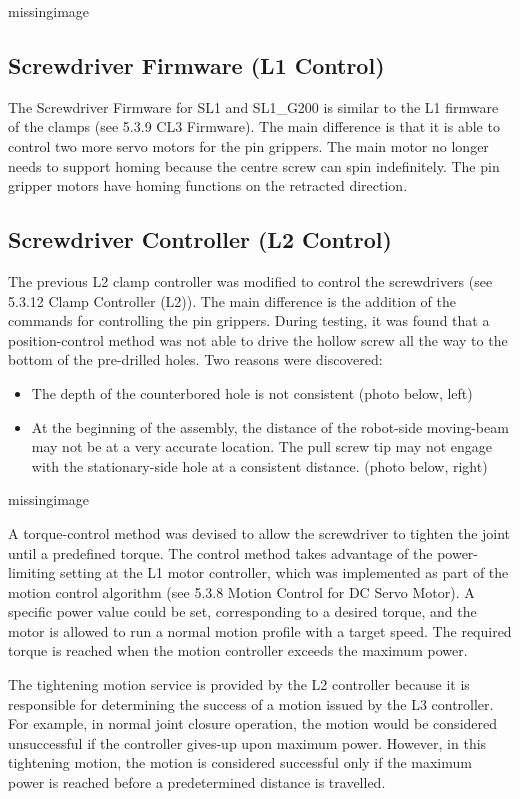 missingimage

\subsection{Screwdriver Firmware (L1 Control)}
The Screwdriver Firmware for SL1 and SL1\_G200 is similar to the L1 firmware of the clamps (see 5.3.9 CL3 Firmware). The main difference is that it is able to control two more servo motors for the pin grippers.
The main motor no longer needs to support homing because the centre screw can spin indefinitely. The pin gripper motors have homing functions on the retracted direction.

\subsection{Screwdriver Controller (L2 Control)}
The previous L2 clamp controller was modified to control the screwdrivers (see 5.3.12 Clamp Controller (L2)). The main difference is the addition of the commands for controlling the pin grippers. 
During testing, it was found that a position-control method was not able to drive the hollow screw all the way to the bottom of the pre-drilled holes. Two reasons were discovered: 
\begin{itemize}
    \item The depth of the counterbored hole is not consistent (photo below, left)
    \item At the beginning of the assembly, the distance of the robot-side moving-beam may not be at a very accurate location. The pull screw tip may not engage with the stationary-side hole at a consistent distance. (photo below, right)
\end{itemize}

missingimage

A torque-control method was devised to allow the screwdriver to tighten the joint until a predefined torque. The control method takes advantage of the power-limiting setting at the L1 motor controller, which was implemented as part of the motion control algorithm (see 5.3.8 Motion Control for DC Servo Motor). A specific power value could be set, corresponding to a desired torque, and the motor is allowed to run a normal motion profile with a target speed. The required torque is reached when the motion controller exceeds the maximum power. 

The tightening motion service is provided by the L2 controller because it is responsible for determining the success of a motion issued by the L3 controller. For example, in normal joint closure operation, the motion would be considered unsuccessful if the controller gives-up upon maximum power. However, in this tightening motion, the motion is considered successful only if the maximum power is reached before a predetermined distance is travelled. 

